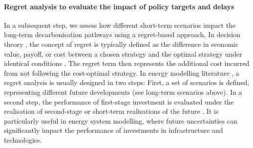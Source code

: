 \documentclass[pdflatex,sn-nature]{sn-jnl}%
\theoremstyle{thmstyleone}%
\theoremstyle{thmstyletwo}%
\theoremstyle{thmstylethree}%
\begin{document}
\paragraph{Regret analysis to evaluate the impact of policy targets and delays}
In a subsequent step, we assess how different short-term scenarios impact the long-term decarbonisation pathways using a regret-based approach. In decision theory \cite{loomesRegretTheoryAlternative1982}, the concept of regret is typically defined as the difference in economic value, payoff, or cost between a chosen strategy and the optimal strategy under identical conditions \cite{mobiusRegretAnalysisInvestment2020}. The regret term then represents the additional cost incurred from not following the cost-optimal strategy. In energy modelling literature \cite{vanderweijdeEconomicsPlanningElectricity2012,mobiusRegretAnalysisInvestment2020}, a regret analysis is usually designed in two steps: First, a set of scenarios is defined, representing different future developments (see long-term scenarios above). In a second step, the performance of first-stage investment is evaluated under the realisation of second-stage or short-term realisations of the future \cite{salvatoreManagerialEconomicPrinciples2008}. It is particularly useful in energy system modelling, where future uncertainties can significantly impact the performance of investments in infrastructure and technologies. 
\end{document}
